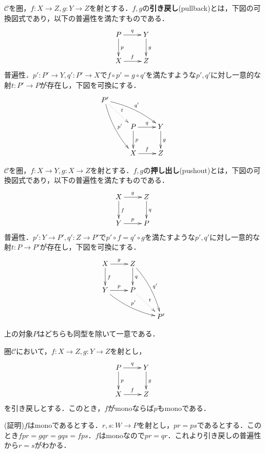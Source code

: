 \begin{defi}
$\mathcal{C}$を圏，$f:X \to Z, g:Y \to Z$を射とする．$f,g$の{\bf 引き戻し}(pullback)とは，下図の可換図式であり，以下の普遍性を満たすものである．
\[
\xymatrix
{
P \ar[r]^{q} \ar[d]^{p} 	& Y \ar[d]^g\\
X \ar[r]^{f}			& Z
}
\]
普遍性．$p' : P' \to Y, q': P' \to X$で$f \circ p' = g\circ q'$を満たすような$p',q'$に対し一意的な射$t:P' \to P$が存在し，下図を可換にする．
\[
\xymatrix
{
P' \ar@/_/[rdd]^{p'} \ar@/^/[rrd]^{q'}  \ar@{.>}[rd]^t\\
&	P \ar[d]^{p} \ar[r]^{q} 	& Y \ar[d]^g\\
&	X \ar[r]^{f}			& Z
}
\]
\end{defi} \proofend

\begin{defi}
$\mathcal{C}$を圏，$f:X \to Y, g:X \to Z$を射とする．$f,g$の{\bf 押し出し}(pushout)とは，下図の可換図式であり，以下の普遍性を満たすものである．
\[
\xymatrix
{
X \ar[r]^{g} \ar[d]^{f} 	& Z \ar[d]^q\\
Y \ar[r]^{p}			& P
}
\]
普遍性．$p' : Y \to P', q': Z \to P'$で$p' \circ f  =q' \circ g$を満たすような$p',q'$に対し一意的な射$t:P \to P'$が存在し，下図を可換にする．
\[
\xymatrix
{
X \ar[r]^{g} \ar[d]^{f} 	& Z \ar[d]^q\ar@/^/[rdd]^{q'}\\ 
Y \ar[r]^{p} \ar@/_/[rrd]^{p'}& P \ar@{.>}[rd]^t  \\
&&P'
}
\]
\end{defi} \proofend

上の対象$P$はどちらも同型を除いて一意である．

\begin{prop}
圏$\mathcal{C}$において，$f:X \to Z, g:Y \to Z$を射とし，
\[
\xymatrix
{
P \ar[d]^{p} \ar[r]^{q} 	& Y \ar[d]^g\\
X \ar[r]^{f}			& Z
}
\]
を引き戻しとする．このとき，$f$がmonoならば$p$もmonoである．
\end{prop}
(証明)$f$はmonoであるとする．$r,s:W \to P$を射とし，$pr=ps$であるとする．このとき$fpr = gqr = gqs = fps$．$f$はmonoなので$pr=qr$．これより引き戻しの普遍性から$r=s$がわかる．

